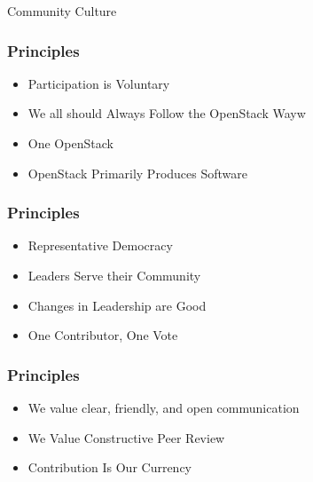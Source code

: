 \documentclass[aspectratio=169,11pt,hyperref={colorlinks=true}]{beamer}
\begin{document}
\begin{frame}[c]
  \begin{center}
      \color{white}
      \Huge Community Culture
  \end{center}
\end{frame}


\begin{frame}
  \frametitle{Principles}
    \begin{itemize}
        \item{Participation is Voluntary}
        \item{We all should Always Follow the OpenStack Wayw}
        \item{One OpenStack}
        \item{OpenStack Primarily Produces Software}
    \end{itemize}
\end{frame}

\begin{frame}
  \frametitle{Principles}
    \begin{itemize}
        \item{Representative Democracy}
        \item{Leaders Serve their Community}
        \item{Changes in Leadership are Good}
        \item{One Contributor, One Vote}
    \end{itemize}
\end{frame}

\begin{frame}
  \frametitle{Principles}
    \begin{itemize}
        \item{We value clear, friendly, and open communication}
        \item{We Value Constructive Peer Review}
        \item{Contribution Is Our Currency}
    \end{itemize}
\end{frame}
\end{document}
